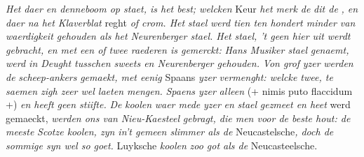 \pstart \textit{Het }\textit{}\protect{}\textit{ daer en denneboom op staet, is het best; welcken} Keur \textit{het merk de }\textit{}\protect{} \textit{ dit de }\textit{}\protect{}\textit{, en daer na het }\textit{Klaverblat}\protect{} reght \textit{of crom. Het }\textit{}\textit{ }\textit{stael}\protect{}\textit{ werd tien ten hondert minder van waerdigkeit gehouden als het }\textit{Neurenberger stael}\protect{}\textit{. Het }\textit{stael}\protect{}\textit{, 't geen hier uit }\textit{}\textit{ werdt gebracht, en met een of twee raederen is gemerckt: }\textit{Hans Musiker stael}\protect{}\textit{ genaemt, werd in Deught tusschen sweets en Neurenberger gehouden. }
\pend 
\pstart \textit{ Von grof }\textit{yzer}\protect{}\textit{ werden de }\textit{scheep-ankers}\protect{}\textit{ gemaekt, met eenig} Spaans \textit{yzer}\protect{}\textit{ vermenght: welcke twee, te saemen zigh zeer wel laeten mengen. }\textit{Spaens yzer}\protect{} \textit{alleen }\textit{ } (+ nimis puto flaccidum +) \textit{en heeft geen stiifte.}\textit{}
\pend
\pstart \textit{ De }\textit{koolen}\protect{}\textit{ waer mede }\textit{yzer}\protect{}\textit{ en }\textit{stael}\protect{}\textit{ gezmeet en heet} werd gemaeckt, \textit{werden ons van }\textit{Nieu-Kaesteel}\protect{}\textit{ gebragt, die men voor de beste hout: de meeste }\textit{Scotze koolen}\protect{}\textit{, zyn in't gemeen slimmer als de} Neucastelsche\protect{}\textit{, doch de sommige syn wel so goet.} Luyksche \textit{koolen}\protect{}\textit{ zoo got als de} Neucasteelsche\protect{}. \pend 
